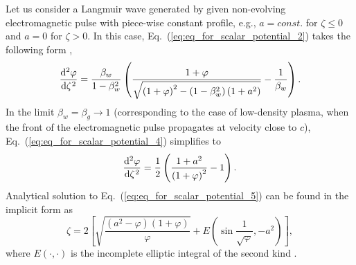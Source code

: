 \documentclass[10pt, a4paper, twoside, openright]{report}
\begin{document}
Let us consider a Langmuir wave generated by given non-evolving electromagnetic pulse with piece-wise constant profile,  e.g., $ a = const. $ for $ \zeta \leq 0 $ and $ a = 0 $ for $ \zeta > 0 $. In this case, Eq.~(\ref{eq:eq_for_scalar_potential_2}) takes the following form \cite{Bulanov2016, Bulanov2021},
\begin{equation}\label{eq:eq_for_scalar_potential_4}
\diff[2]{\varphi}{\zeta} = \frac{\beta_w}{1 - \beta_w^2} \left( \frac{1 + \varphi}{\sqrt{\left( 1 + \varphi \right)^2 - \left( 1 - \beta_w^2 \right) \left( 1 + a^2 \right)}} - \frac{1}{\beta_w} \right).
\end{equation}
In the limit $ \beta_w = \beta_g \rightarrow 1 $ (corresponding to the case of low-density plasma, when the front of the electromagnetic pulse propagates at velocity close to $ c $), Eq.~(\ref{eq:eq_for_scalar_potential_4}) simplifies to \cite{Bulanov1989, Berezhiani1990, Esarey2009, Bulanov2016, Bulanov2021}
\begin{equation}\label{eq:eq_for_scalar_potential_5}
\diff[2]{\varphi}{\zeta} = \frac{1}{2} \left( \frac{1 + a^2}{\left( 1 + \varphi \right)^2} - 1 \right).
\end{equation}
Analytical solution to Eq.~(\ref{eq:eq_for_scalar_potential_5}) can be found in the implicit form as \cite{Bulanov1989, Berezhiani1990, Bulanov2016, Bulanov2021}
\begin{equation}\label{eq:analytical_solution}
\zeta = 2 \left[ \sqrt{\frac{\left( a^2 - \varphi \right) \left( 1 + \varphi \right)}{\varphi}} + E \left( \sin \frac{1}{\sqrt{\varphi}}, -a^2 \right) \right],
\end{equation}
where $ E \left( \cdot, \cdot \right) $ is the incomplete elliptic integral of the second kind \cite{Gradshteyn1980}. 
\end{document}
